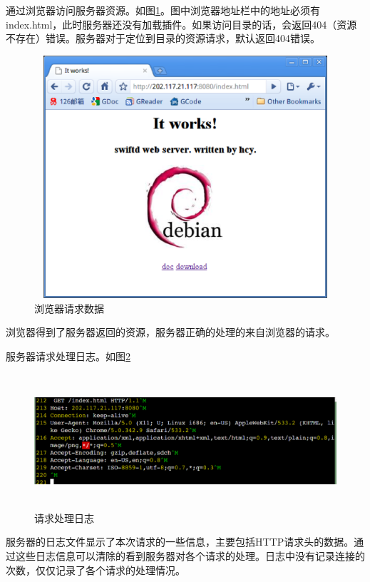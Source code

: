 \documentclass[12pt, twoside, a4paper, xetex]{report}
\begin{document}
	通过浏览器访问服务器资源。如图\ref{access1}。图中浏览器地址栏中的地址必须有index.html，此时服务器还没有加载插件。如果访问目录的话，会返回404（资源不存在）错误。服务器对于定位到目录的资源请求，默认返回404错误。
	
	\begin{figure}[htbp]
	\centering
	\setlength{\abovecaptionskip}{0pt}
	\setlength{\belowcaptionskip}{10pt}
	\caption{浏览器请求数据}
	\label{access1}
	\includegraphics[height=9cm, width=12cm]{pics/access1.eps}
	\end{figure}
	
	浏览器得到了服务器返回的资源，服务器正确的处理的来自浏览器的请求。
	
	服务器请求处理日志。如图\ref{access1log}
	
	\begin{figure}[htbp]
	\centering
	\setlength{\abovecaptionskip}{0pt}
	\setlength{\belowcaptionskip}{10pt}
	\caption{请求处理日志}
	\label{access1log}
	\includegraphics[height=5cm, width=15cm]{pics/access1log.eps}
	\end{figure}
	
	服务器的日志文件显示了本次请求的一些信息，主要包括HTTP请求头的数据。通过这些日志信息可以清除的看到服务器对各个请求的处理。日志中没有记录连接的次数，仅仅记录了各个请求的处理情况。
	
\end{document}
